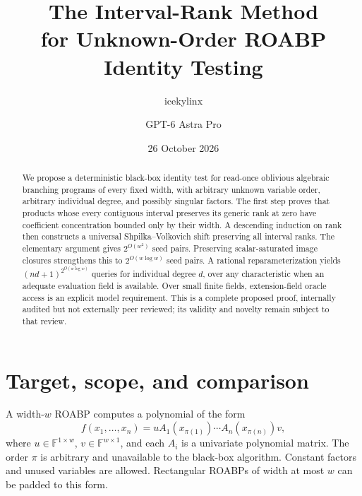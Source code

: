 \documentclass[11pt]{article}
\title{The Interval-Rank Method\\for Unknown-Order ROABP Identity Testing}
\author{icekylinx \and GPT-6 Astra Pro}
\date{26 October 2026}
\theoremstyle{definition}\newtheorem{definition}[theorem]{Definition}
\theoremstyle{remark}\newtheorem{remark}[theorem]{Remark}
\newcommand{\F}{\mathbb F}
\begin{document}
\maketitle
\begin{center}
\end{center}
\begin{abstract}
We propose a deterministic black-box identity test for read-once oblivious
algebraic branching programs of every fixed width, with arbitrary unknown
variable order, arbitrary individual degree, and possibly singular factors.
The first step proves that products whose every contiguous interval
preserves its generic rank at zero have coefficient concentration bounded
only by their width. A descending induction on rank then constructs a
universal Shpilka--Volkovich shift preserving all interval ranks. The
elementary argument gives $2^{O(w^2)}$ seed pairs. Preserving scalar-saturated
image closures strengthens this to $2^{O(w\log w)}$ seed pairs. A rational
reparameterization yields $(nd+1)^{2^{O(w\log w)}}$ queries for individual
degree $d$, over any characteristic when an adequate evaluation field is
available. Over small finite fields, extension-field oracle access is an
explicit model requirement. This is a complete proposed proof, internally
audited but not externally peer reviewed; its validity and novelty remain
subject to that review.
\end{abstract}
\tableofcontents
\newpage
\section{Target, scope, and comparison}

A width-$w$ ROABP computes a polynomial of the form
\[
 f(x_1,\ldots,x_n)=uA_1(x_{\pi(1)})\cdots A_n(x_{\pi(n)})v,
\]
where $u\in\F^{1\times w}$, $v\in\F^{w\times1}$, and each $A_i$ is a
univariate polynomial matrix. The order $\pi$ is arbitrary and unavailable
to the black-box algorithm. Constant factors and unused variables are
allowed. Rectangular ROABPs of width at most $w$ can be padded to this form.
\end{document}
